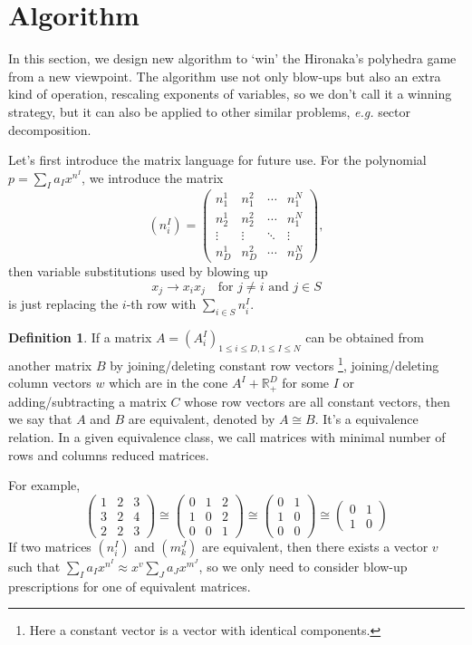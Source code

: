 \documentclass[12pt]{article}
\theoremstyle{definition}
\newtheorem{defi}[para]{Definition}
\theoremstyle{plain}
\begin{document}
\section{Algorithm}\label{s:alg}

In this section, we design new algorithm to `win' the Hironaka's
polyhedra game from a new viewpoint. The algorithm use not only blow-ups
but also an extra kind of operation, rescaling exponents of variables, 
so we don't call it a winning strategy, but it can also be applied to other
similar problems, \textit{e.g.} sector decomposition. 

Let's first introduce the matrix language for future use.
For the polynomial $p=\sum_I a_I x^{n^I}$, we introduce the matrix 
\[
	(n_{i}^{I})=
\begin{pmatrix}
	n_1^1 & n_1^2 & \cdots & n_1^N\\
	n_2^1 & n_2^2 & \cdots & n_1^N\\
	\vdots & \vdots & \ddots & \vdots\\
	n_D^1 & n_D^2 & \cdots & n_D^N
\end{pmatrix},
\]
then variable substitutions used by blowing up
\[
	x_j\to x_ix_j \quad \text{for $j\neq i$ and $j\in S$}
\] 
is just replacing the $i$-th row with $\sum_{i\in S} n_i^I$.

\begin{defi}
If a matrix $A=(A^I_i)_{1\leq i\leq D,1\leq I\leq N}$ 
can be obtained from another matrix $B$ by joining/deleting constant row vectors%
\footnote{Here a constant vector is a vector with identical components.},
joining/deleting column vectors $w$ which are in the cone $A^I+\mathbb R_+^D$ for 
some $I$ or adding/subtracting a matrix $C$ whose row vectors are all constant vectors,
then we say that $A$ and $B$ are equivalent, denoted by $A\cong B$.
It's a equivalence relation.
In a given equivalence class, we call matrices with minimal number of rows and columns 
reduced matrices.
\end{defi}

For example, 
\[
\begin{pmatrix}
	1&2&3\\
	3&2&4\\
	2&2&3
\end{pmatrix}\cong
\begin{pmatrix}
	0&1&2\\
	1&0&2\\
	0&0&1
\end{pmatrix}\cong
\begin{pmatrix}
	0&1\\
	1&0\\
	0&0
\end{pmatrix}\cong
\begin{pmatrix}
	0&1\\
	1&0
\end{pmatrix} 
\]
If two matrices $(n^I_i)$ and $(m^J_k)$ are equivalent, then there exists a vector $v$ such that 
$\sum_I a_I x^{n^I}\approx x^v\sum_J a_J x^{m^J}$, so we only need to consider blow-up prescriptions for one of equivalent matrices.
\end{document}
